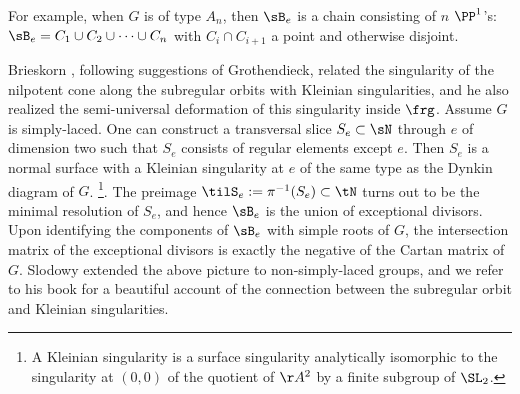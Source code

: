 For example, when $G$ is of type $A_{n}$, then $\sB_{e}$ is a chain consisting of $n$ $\PP^{1}$'s:  $\sB_{e}=C_{1}\cup C_{2}\cup\cdots\cup C_{n}$ with $C_{i}\cap C_{i+1}$ a point and otherwise disjoint.


Brieskorn \cite{Brieskorn}, following suggestions of Grothendieck, related the singularity of the nilpotent cone along the subregular orbits with Kleinian singularities, and he also realized the semi-universal deformation of this singularity inside $\frg$. Assume $G$ is simply-laced. One can construct a transversal slice $S_{e}\subset\sN$ through $e$ of dimension two such that $S_{e}$ consists of regular elements except $e$. Then $S_{e}$ is a normal surface with a Kleinian singularity at $e$ of the same type as the Dynkin diagram of $G$. \footnote{A Kleinian singularity is a surface singularity analytically isomorphic to the singularity at $(0,0)$ of the quotient of $\AA^{2}$ by a finite subgroup of $\SL_{2}$.}.  The preimage $\tilS_{e}:=\pi^{-1}(S_{e})\subset\tN$ turns out to be the minimal resolution of $S_{e}$, and hence $\sB_{e}$ is the union of exceptional divisors. Upon identifying the components of $\sB_{e}$ with simple roots of $G$, the intersection matrix of the exceptional divisors is exactly the negative of the Cartan matrix of $G$. Slodowy \cite{Slodowy} extended the above picture to non-simply-laced groups, and we refer to his book \cite{Slodowy} for a beautiful account of the connection between the subregular orbit and Kleinian singularities. 



